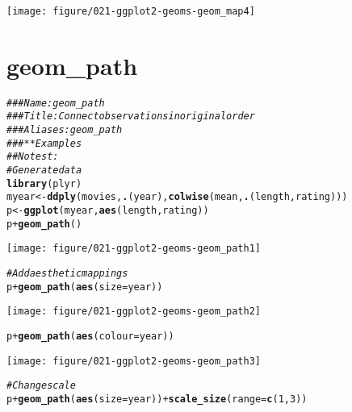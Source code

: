 \documentclass[a4paper,titlepage]{tufte-handout}\usepackage[]{graphicx}\usepackage[]{color}
\makeatletter
\def\maxwidth{ %
  \ifdim\Gin@nat@width>\linewidth
    \linewidth
  \else
    \Gin@nat@width
  \fi
}
\newcommand{\hlnum}[1]{\textcolor[rgb]{0.686,0.059,0.569}{#1}}%
\newcommand{\hlcom}[1]{\textcolor[rgb]{0.678,0.584,0.686}{\textit{#1}}}%
\newcommand{\hlopt}[1]{\textcolor[rgb]{0,0,0}{#1}}%
\newcommand{\hlstd}[1]{\textcolor[rgb]{0.345,0.345,0.345}{#1}}%
\newcommand{\hlkwb}[1]{\textcolor[rgb]{0.69,0.353,0.396}{#1}}%
\newcommand{\hlkwc}[1]{\textcolor[rgb]{0.333,0.667,0.333}{#1}}%
\newcommand{\hlkwd}[1]{\textcolor[rgb]{0.737,0.353,0.396}{\textbf{#1}}}%
\newenvironment{kframe}{%
 \def\at@end@of@kframe{}%
 \ifinner\ifhmode%
  \def\at@end@of@kframe{\end{minipage}}%
  \begin{minipage}{\columnwidth}%
 \fi\fi%
 \def\FrameCommand##1{\hskip\@totalleftmargin \hskip-\fboxsep
 \colorbox{shadecolor}{##1}\hskip-\fboxsep
     \hskip-\linewidth \hskip-\@totalleftmargin \hskip\columnwidth}%
 \MakeFramed {\advance\hsize-\width
   \@totalleftmargin\z@ \linewidth\hsize
   \@setminipage}}%
 {\par\unskip\endMakeFramed%
 \at@end@of@kframe}
\newenvironment{knitrout}{}{} %
\makeatother
\begin{document}
\begin{knitrout}
\begin{kframe}
\end{kframe}
\texttt{[image: figure/021-ggplot2-geoms-geom\_map4]} 
\begin{kframe}\begin{alltt}


\end{alltt}
\end{kframe}
\end{knitrout}



\section{geom\_path}

\begin{knitrout}
\color{fgcolor}\begin{kframe}
\begin{alltt}
\hlcom{### Name: geom_path}
\hlcom{### Title: Connect observations in original order}
\hlcom{### Aliases: geom_path}
\hlcom{### ** Examples}
\hlcom{## No test: }
\hlcom{# Generate data}
\hlkwd{library}\hlstd{(plyr)}
\hlstd{myear} \hlkwb{<-} \hlkwd{ddply}\hlstd{(movies,} \hlkwd{.}\hlstd{(year),} \hlkwd{colwise}\hlstd{(mean,} \hlkwd{.}\hlstd{(length, rating)))}
\hlstd{p} \hlkwb{<-} \hlkwd{ggplot}\hlstd{(myear,} \hlkwd{aes}\hlstd{(length, rating))}
\hlstd{p} \hlopt{+} \hlkwd{geom_path}\hlstd{()}
\end{alltt}
\end{kframe}
\texttt{[image: figure/021-ggplot2-geoms-geom\_path1]} 
\begin{kframe}\begin{alltt}
\hlcom{# Add aesthetic mappings}
\hlstd{p} \hlopt{+} \hlkwd{geom_path}\hlstd{(}\hlkwd{aes}\hlstd{(}\hlkwc{size} \hlstd{= year))}
\end{alltt}
\end{kframe}
\texttt{[image: figure/021-ggplot2-geoms-geom\_path2]} 
\begin{kframe}\begin{alltt}
\hlstd{p} \hlopt{+} \hlkwd{geom_path}\hlstd{(}\hlkwd{aes}\hlstd{(}\hlkwc{colour} \hlstd{= year))}
\end{alltt}
\end{kframe}
\texttt{[image: figure/021-ggplot2-geoms-geom\_path3]} 
\begin{kframe}\begin{alltt}
\hlcom{# Change scale}
\hlstd{p} \hlopt{+} \hlkwd{geom_path}\hlstd{(}\hlkwd{aes}\hlstd{(}\hlkwc{size} \hlstd{= year))} \hlopt{+} \hlkwd{scale_size}\hlstd{(}\hlkwc{range} \hlstd{=} \hlkwd{c}\hlstd{(}\hlnum{1}\hlstd{,} \hlnum{3}\hlstd{))}

\end{alltt}
\end{kframe}
\end{knitrout}
\end{document}
